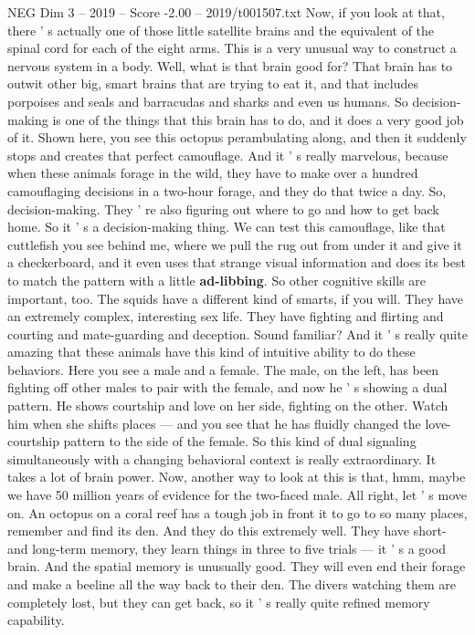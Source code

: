 \begin{textsample}{NEG Dim 3 – 2019 – Score -2.00 – 2019/t001507.txt}
Now, if you look at that, there ' s actually one of those little satellite brains and the equivalent of the spinal cord for each of the eight arms.
This is a very unusual way to construct a nervous system in a body.
Well, what is that brain good for?
That brain has to outwit other big, smart brains that are trying to eat it, and that includes porpoises and seals and barracudas and sharks and even us humans.
So decision-making is one of the things that this brain has to do, and it does a very good job of it.
Shown here, you see this octopus perambulating along, and then it suddenly stops and creates that perfect camouflage.
And it ' s really marvelous, because when these animals forage in the wild, they have to make over a hundred camouflaging decisions in a two-hour forage, and they do that twice a day.
So, decision-making.
They ' re also figuring out where to go and how to get back home.
So it ' s a decision-making thing.
We can test this camouflage, like that cuttlefish you see behind me, where we pull the rug out from under it and give it a checkerboard, and it even uses that strange visual information and does its best to match the pattern with a little \textbf{ad-libbing}.
So other cognitive skills are important, too.
The squids have a different kind of smarts, if you will.
They have an extremely complex, interesting sex life.
They have fighting and flirting and courting and mate-guarding and deception.
Sound familiar?
And it ' s really quite amazing that these animals have this kind of intuitive ability to do these behaviors.
Here you see a male and a female.
The male, on the left, has been fighting off other males to pair with the female, and now he ' s showing a dual pattern.
He shows courtship and love on her side, fighting on the other.
Watch him when she shifts places — and you see that he has fluidly changed the love-courtship pattern to the side of the female.
So this kind of dual signaling simultaneously with a changing behavioral context is really extraordinary.
It takes a lot of brain power.
Now, another way to look at this is that, hmm, maybe we have 50 million years of evidence for the two-faced male.
All right, let ' s move on.
An octopus on a coral reef has a tough job in front it to go to so many places, remember and find its den.
And they do this extremely well.
They have short- and long-term memory, they learn things in three to five trials — it ' s a good brain.
And the spatial memory is unusually good.
They will even end their forage and make a beeline all the way back to their den.
The divers watching them are completely lost, but they can get back, so it ' s really quite refined memory capability.

\end{textsample}
